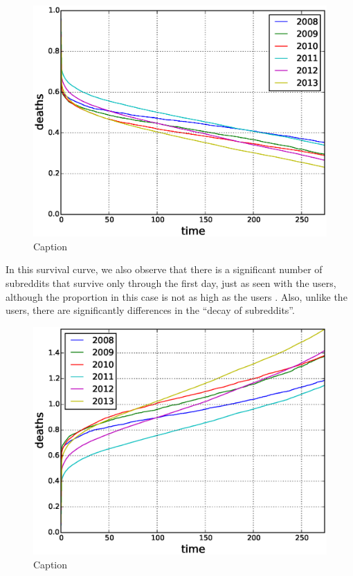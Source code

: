 \begin{figure}[!tb]
\centering
\includegraphics[scale=0.4]{./images/kaplan_meier_subreddits.eps}
\caption{Caption}
\label{fig:kaplan_meier_subreddits}
\end{figure}

In this survival curve, we also observe that there is a significant number of subreddits that survive only through the first day, just as seen with the users, although the proportion in this case is not as high as the users . Also, unlike the users, there are significantly differences in the ``decay of subreddits''.

\begin{figure}[!tb]
\centering
\includegraphics[scale=0.4]{./images/nelson_aalen_subreddits.eps}
\caption{Caption}
\label{fig:nelson_aalen_subreddits}
\end{figure}